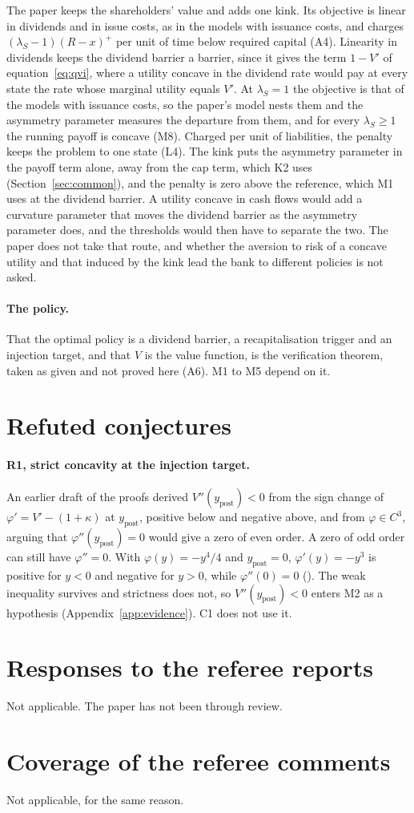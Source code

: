 The paper keeps the shareholders' value and adds one kink. Its objective is
linear in dividends and in issue costs, as in the models with issuance costs,
and charges $(\lambda_S-1)(R-x)^+$ per unit of time below required capital
(A4). Linearity in dividends keeps the dividend barrier a barrier, since it
gives the term $1-V'$ of equation~\eqref{eq:qvi}, where a utility concave in
the dividend rate would pay at every state the rate whose marginal utility
equals $V'$. At $\lambda_S=1$ the objective is that of the models with
issuance costs, so the paper's model nests them and the asymmetry parameter
measures the departure from them, and for every $\lambda_S\ge1$ the running
payoff is concave (M8). Charged per unit of liabilities, the penalty keeps the
problem to one state (L4). The kink puts the asymmetry parameter in the payoff
term alone, away from the cap term, which K2 uses (Section~\ref{sec:common}),
and the penalty is zero above the reference, which M1 uses at the dividend
barrier. A utility concave in cash flows would add a curvature parameter that
moves the dividend barrier as the asymmetry parameter does, and the thresholds
would then have to separate the two. The paper does not take that route, and
whether the aversion to risk of a concave utility and that induced by the kink
lead the bank to different policies is not asked.

\paragraph{The policy.} That the optimal policy is a dividend barrier, a
recapitalisation trigger and an injection target, and that $V$ is the value
function, is the verification theorem, taken as given and not proved here
(A6). M1 to M5 depend on it.

\section{Refuted conjectures}
\label{app:refuted}

\paragraph{R1, strict concavity at the injection target.} An earlier draft of
the proofs derived $V''(y_{\text{post}})<0$ from the sign change of
$\varphi'=V'-(1+\kappa)$ at $y_{\text{post}}$, positive below and negative above,
and from $\varphi\in C^3$, arguing that $\varphi''(y_{\text{post}})=0$ would give
a zero of even order. A zero of odd order can still have $\varphi''=0$. With
$\varphi(y)=-y^4/4$ and $y_{\text{post}}=0$, $\varphi'(y)=-y^3$ is positive for
$y<0$ and negative for $y>0$, while $\varphi''(0)=0$
(). The weak inequality survives and
strictness does not, so $V''(y_{\text{post}})<0$ enters M2 as a hypothesis
(Appendix~\ref{app:evidence}). C1 does not use it.

\section{Responses to the referee reports}

Not applicable. The paper has not been through review.

\section{Coverage of the referee comments}

Not applicable, for the same reason.



